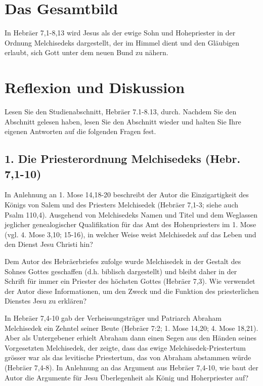 \documentclass[]{krantz}
\begin{document}
\section{Das Gesamtbild}\label{das-gesamtbild-5}

In Hebräer 7,1-8,13 wird Jesus als der ewige Sohn und Hohepriester in
der Ordnung Melchisedeks dargestellt, der im Himmel dient und den
Gläubigen erlaubt, sich Gott unter dem neuen Bund zu nähern.

\section{Reflexion und Diskussion}\label{reflexion-und-diskussion-5}

Lesen Sie den Studienabschnitt, Hebräer 7.1-8.13, durch. Nachdem Sie den
Abschnitt gelesen haben, lesen Sie den Abschnitt wieder und halten Sie
Ihre eigenen Antworten auf die folgenden Fragen fest.

\subsection{1. Die Priesterordnung Melchisedeks (Hebr.
7,1-10)}\label{die-priesterordnung-melchisedeks-hebr.-71-10}

In Anlehnung an 1. Mose 14,18-20 beschreibt der Autor die
Einzigartigkeit des Königs von Salem und des Priesters Melchisedek
(Hebräer 7,1-3; siehe auch Psalm 110,4). Ausgehend von Melchisedeks
Namen und Titel und dem Weglassen jeglicher genealogischer Qualifikation
für das Amt des Hohenpriesters im 1. Mose (vgl. 4. Mose 3,10; 15-16), in
welcher Weise weist Melchisedek auf das Leben und den Dienst Jesu
Christi hin?

Dem Autor des Hebräerbriefes zufolge wurde Melchisedek in der Gestalt
des Sohnes Gottes geschaffen (d.h. biblisch dargestellt) und bleibt
daher in der Schrift für immer ein Priester des höchsten Gottes (Hebräer
7,3). Wie verwendet der Autor diese Informationen, um den Zweck und die
Funktion des priesterlichen Dienstes Jesu zu erklären?

In Hebräer 7,4-10 gab der Verheissungsträger und Patriarch Abraham
Melchisedek ein Zehntel seiner Beute (Hebräer 7:2; 1. Mose 14,20; 4.
Mose 18,21). Aber als Untergebener erhielt Abraham dann einen Segen aus
den Händen seines Vorgesetzten Melchisedek, der zeigte, dass das ewige
Melchisedek-Priestertum grösser war als das levitische Priestertum, das
von Abraham abstammen würde (Hebräer 7,4-8). In Anlehnung an das
Argument aus Hebräer 7,4-10, wie baut der Autor die Argumente für Jesu
Überlegenheit als König und Hoherpriester auf?
\end{document}
